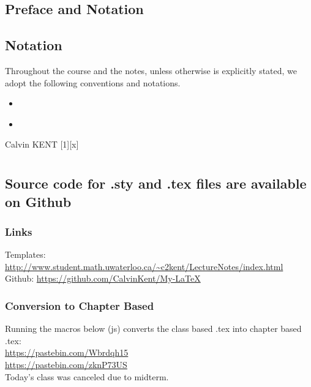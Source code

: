\documentclass[11pt,oneside]{book} %
\begin{document}
	\renewcommand*{\term}{Term 2000} %
	\renewcommand*{\coursecode}{MATH 000} %
	\renewcommand*{\coursename}{Course Name} %
	\renewcommand*{\profname}{Prof Name} %
	\renewcommand*{\colink}{http://www.student.math.uwaterloo.ca/~c2kent} %
	\setfigpath
	\inserttoctitle
	\pagestyle{plain}
	\section*{Preface and Notation}
	\ckpreface
	\section*{Notation}
	Throughout the course and the notes, unless otherwise is explicitly stated, we adopt the following conventions and notations.
	\begin{itemize}
		\item ~
		\item ~
	\end{itemize}
	\hfill Calvin KENT
	\clearpage
	\pagestyle{chapterlecture}
	[x]
		\chapter{\chapname\chaplec}
		\section{Source code for .sty and .tex files are available on Github}
		\subsection{Links}
		Templates: \url{http://www.student.math.uwaterloo.ca/~c2kent/LectureNotes/index.html}\\
		Github: \url{https://github.com/CalvinKent/My-LaTeX}
		\subsection{Conversion to Chapter Based}
		Running the macros below (js) converts the class based .tex into chapter based .tex:\\
		\url{https://pastebin.com/Wbrdqh15}\\
		\url{https://pastebin.com/zknP73US}\\[\baselineskip]
		Today's class was canceled due to midterm.
\end{document}
